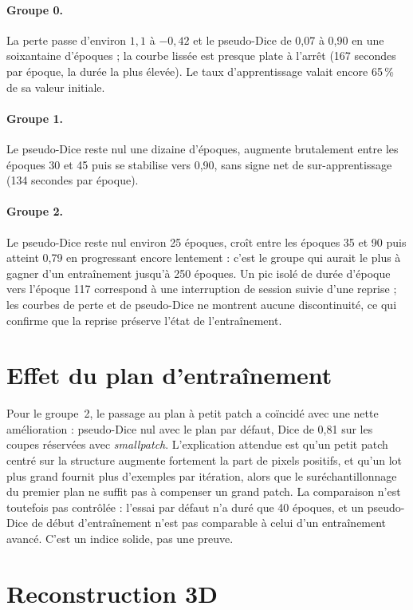 \documentclass[12pt,a4paper]{report}
\begin{document}
\paragraph{Groupe 0.} La perte passe d'environ $1{,}1$ à $-0{,}42$ et le pseudo-Dice de 0,07 à 0,90 en une soixantaine d'époques ; la courbe lissée est presque plate à l'arrêt (167 secondes par époque, la durée la plus élevée). Le taux d'apprentissage valait encore 65\,\% de sa valeur initiale.

\paragraph{Groupe 1.} Le pseudo-Dice reste nul une dizaine d'époques, augmente brutalement entre les époques 30 et 45 puis se stabilise vers 0,90, sans signe net de sur-apprentissage (134 secondes par époque).

\paragraph{Groupe 2.} Le pseudo-Dice reste nul environ 25 époques, croît entre les époques 35 et 90 puis atteint 0,79 en progressant encore lentement : c'est le groupe qui aurait le plus à gagner d'un entraînement jusqu'à 250 époques. Un pic isolé de durée d'époque vers l'époque 117 correspond à une interruption de session suivie d'une reprise ; les courbes de perte et de pseudo-Dice ne montrent aucune discontinuité, ce qui confirme que la reprise préserve l'état de l'entraînement.

\section{Effet du plan d'entraînement}

Pour le groupe~2, le passage au plan à petit patch a coïncidé avec une nette amélioration : pseudo-Dice nul avec le plan par défaut, Dice de 0,81 sur les coupes réservées avec \textit{smallpatch}. L'explication attendue est qu'un petit patch centré sur la structure augmente fortement la part de pixels positifs, et qu'un lot plus grand fournit plus d'exemples par itération, alors que le suréchantillonnage du premier plan ne suffit pas à compenser un grand patch. La comparaison n'est toutefois pas contrôlée : l'essai par défaut n'a duré que 40 époques, et un pseudo-Dice de début d'entraînement n'est pas comparable à celui d'un entraînement avancé. C'est un indice solide, pas une preuve.

\section{Reconstruction 3D}
\end{document}
